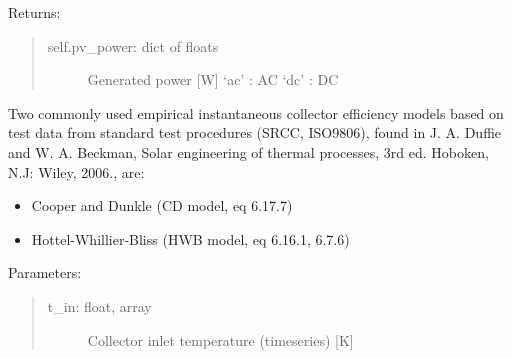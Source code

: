 \documentclass[letterpaper,10pt,english,openany]{sphinxmanual}
\begin{document}
\begin{fulllineitems}
\begin{fulllineitems}
\begin{quote}
\begin{description}
\end{description}
\end{quote}

Returns:
\begin{quote}
\begin{description}
\item[{self.pv\_power: dict of floats}] \leavevmode
Generated power {[}W{]}
‘ac’ : AC
‘dc’ : DC

\end{description}
\end{quote}

\end{fulllineitems}


\begin{fulllineitems}
\label{\detokenize{source/mswh.system:mswh.system.components.Converter.size}}
\end{fulllineitems}


\begin{fulllineitems}
\label{\detokenize{source/mswh.system:mswh.system.components.Converter.solar_collector}}
Two commonly used empirical instantaneous collector
efficiency models based on test data from standard
test procedures (SRCC, ISO9806), found in
J. A. Duffie and W. A. Beckman, Solar engineering of thermal processes, 3rd ed. Hoboken, N.J: Wiley, 2006., are:
\begin{itemize}
\item {} 
Cooper and Dunkle (CD model, eq 6.17.7)

\item {} 
Hottel-Whillier-Bliss (HWB model, eq 6.16.1, 6.7.6)

\end{itemize}

Parameters:
\begin{quote}
\begin{description}
\item[{t\_in: float, array}] \leavevmode
Collector inlet temperature (timeseries) {[}K{]}


\end{description}
\end{quote}
\end{fulllineitems}
\end{fulllineitems}
\end{document}
